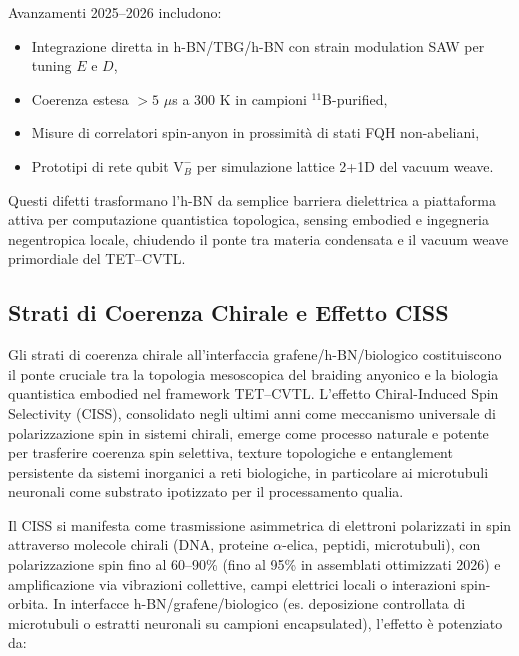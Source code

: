 \documentclass[11pt,a4paper]{article}
\theoremstyle{plain}
\theoremstyle{definition}
\begin{document}
Avanzamenti 2025--2026 includono:
\begin{itemize}
    \item Integrazione diretta in h-BN/TBG/h-BN con strain modulation SAW per tuning $E$ e $D$,
    \item Coerenza estesa $>5$ $\mu$s a 300 K in campioni $^{11}$B-purified,
    \item Misure di correlatori spin-anyon in prossimità di stati FQH non-abeliani,
    \item Prototipi di rete qubit $\mathrm{V}_B^-$ per simulazione lattice 2+1D del vacuum weave.
\end{itemize}

Questi difetti trasformano l'h-BN da semplice barriera dielettrica a piattaforma attiva per computazione quantistica topologica, sensing embodied e ingegneria negentropica locale, chiudendo il ponte tra materia condensata e il vacuum weave primordiale del TET--CVTL.

\vspace{0.3cm}



\subsection{Strati di Coerenza Chirale e Effetto CISS}

Gli strati di coerenza chirale all'interfaccia grafene/h-BN/biologico costituiscono il ponte cruciale tra la topologia mesoscopica del braiding anyonico e la biologia quantistica embodied nel framework TET--CVTL. L'effetto Chiral-Induced Spin Selectivity (CISS), consolidato negli ultimi anni come meccanismo universale di polarizzazione spin in sistemi chirali, emerge come processo naturale e potente per trasferire coerenza spin selettiva, texture topologiche e entanglement persistente da sistemi inorganici a reti biologiche, in particolare ai microtubuli neuronali come substrato ipotizzato per il processamento qualia.

\vspace{0.8cm}

Il CISS si manifesta come trasmissione asimmetrica di elettroni polarizzati in spin attraverso molecole chirali (DNA, proteine $\alpha$-elica, peptidi, microtubuli), con polarizzazione spin fino al 60--90\% (fino al 95\% in assemblati ottimizzati 2026) e amplificazione via vibrazioni collettive, campi elettrici locali o interazioni spin-orbita. In interfacce h-BN/grafene/biologico (es. deposizione controllata di microtubuli o estratti neuronali su campioni encapsulated), l'effetto è potenziato da:
\end{document}
